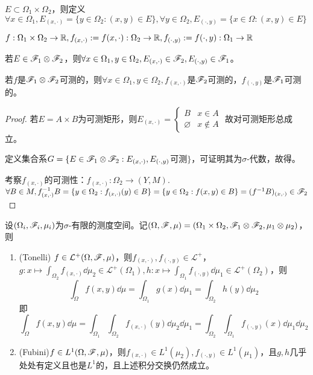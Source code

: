 \documentclass{ctexart}
\begin{document}
\begin{Def}[截口(section)]
  $E\subset \Omega_{1}\times \Omega_{2}$，则定义$\forall x\in\Omega_{1}, E_{(x,\cdot)}=\{y\in\Omega_{2}:(x,y)\in E\},\forall y\in\Omega_{2},E_{(\cdot,y)}=\{x\in\Omega:(x,y)\in E\}$

  $f:\Omega_{1}\times\Omega_{2}\to\mathbb{R}, f_{(x,\cdot)}:=f(x,\cdot):\Omega_{2}\to\mathbb{R}, f_{(\cdot,y)}:=f(\cdot,y):\Omega_{1}\to\mathbb{R}$
\end{Def}

\begin{Prop}
  若$E\in\mathscr{F}_{1}\otimes\mathscr{F}_{2}$，则$\forall x\in\Omega_{1},y\in\Omega_{2}, E_{(x,\cdot)}\in\mathscr{F}_{2},E_{(\cdot,y)}\in\mathscr{F}_{1}$。

  若$f$是$\mathscr{F}_{1}\otimes\mathscr{F}_{2}$可测的，则$\forall x\in\Omega_{1},y\in\Omega_{2}, f_{(x,\cdot)}$是$\mathscr{F}_{2}$可测的，$f_{(\cdot,y)}$是$\mathscr{F}_{1}$可测的。
\end{Prop}

\begin{proof}
  若$E=A\times B$为可测矩形，则$E_{(x,\cdot)}=
  \begin{cases}
    B& x\in A\\ \varnothing & x\not\in A
  \end{cases}
  $
  故对可测矩形总成立。

  定义集合系$G=\{E\in\mathscr{F}_{1}\otimes\mathscr{F}_{2}: E_{(x,\cdot)}, E_{(\cdot,y)}$可测$\}$，可证明其为$\sigma$-代数，故得。

  考察$f_{(x,\cdot)}$的可测性：$f_{(x,\cdot)}:\Omega_{2}\to (Y,M)$. $\forall B\in M, f^{-1}_{(x,\cdot)}B=\{y\in\Omega_{2}:f_{(x,\cdot)}(y)\in B\}=\{y\in\Omega_{2}:f(x,y)\in B\}=(f^{-1}B)_{(x,\cdot)}\in \mathscr{F}_{2}$
  \end{proof}
  \begin{Thm}
  设$(\Omega_{i},\mathscr{F}_{i},\mu_{i})$为$\sigma$-有限的测度空间。记$(\Omega,\mathscr{F},\mu)=(\Omega_{1}\times\Omega_{2},\mathscr{F}_{1}\otimes\mathscr{F}_{2},\mu_{1}\otimes\mu_{2})$，则
    \begin{enumerate}
  \item (Tonelli) $f\in \mathcal{L}^{+}(\Omega,\mathscr{F},\mu)$，则$f_{(x,\cdot)}, f_{(\cdot,y)}\in\mathcal{L}^{+}$，$g:x\mapsto \int_{\Omega_{2}}f_{(x,\cdot)}\dd\mu_{2}\in \mathcal{L}^{+}(\Omega_{1}),h:x\mapsto \int_{\Omega_{1}}f_{(\cdot,y)}\dd\mu_{1}\in \mathcal{L}^{+}(\Omega_{2})$，则
    \[\int_{\Omega}f(x,y)\dd\mu=\int_{\Omega_{1}}g(x)\dd\mu_{1}=\int_{\Omega_{2}}h(y)\dd\mu_{2}\]
    即
    \[\int_{\Omega}f(x,y)\dd\mu
      =\int_{\Omega_{1}}\int_{\Omega_{2}}f_{(x,\cdot)}(y)\dd\mu_{2}\dd\mu_{1}
      =\int_{\Omega_{2}}\int_{\Omega_{1}}f_{(\cdot,y)}(x)\dd\mu_{1}\dd\mu_{2}
    \]
  \item (Fubini)$f\in L^{1}(\Omega,\mathscr{F},\mu)$，则$f_{(x,\cdot)}\in L^{1}(\mu_{2}), f_{(\cdot,y)}\in L^{1}(\mu_{1})$，且$g,h$几乎处处有定义且也是$L^{1}$的，且上述积分交换仍然成立。
  \end{enumerate}
  \end{Thm}
\end{document}

